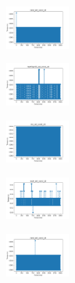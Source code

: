 \begin{figure}[H]
    \begin{subfigure}
        \centering
        \includegraphics[width=0.234\textwidth]{img/agesf/rand_set_const_20_277451237_time.png}
    \end{subfigure}
    \hfill
    \begin{subfigure}
        \centering
        \includegraphics[width=0.234\textwidth]{img/agesf/newthyroid_set_const_20_277451237_time.png}
    \end{subfigure}
    \hfill
    \begin{subfigure}
        \centering
        \includegraphics[width=0.234\textwidth]{img/agesf/iris_set_const_20_49258669_time.png}
    \end{subfigure}
    \hfill
    \begin{subfigure}
        \centering
        \includegraphics[width=0.234\textwidth]{img/agesf/ecoli_set_const_20_49258669_time.png}
    \end{subfigure}
    \hfill
    \begin{subfigure}
        \centering
        \includegraphics[width=0.234\textwidth]{img/agesf/rand_set_const_20_49258669_time.png}
    \end{subfigure}
    \hfill
    \begin{subfigure}
        \centering

\end{subfigure}
\end{figure}
